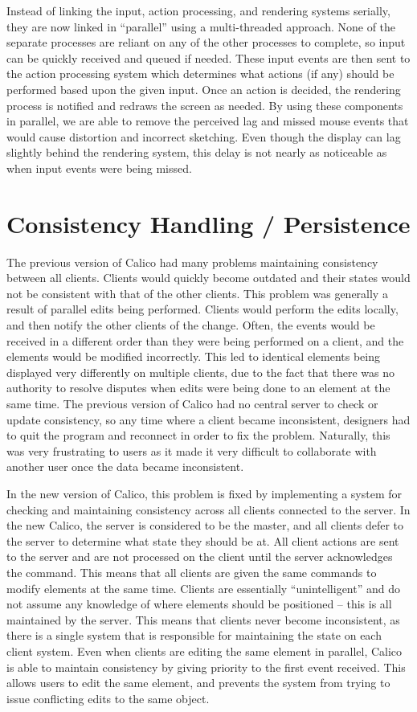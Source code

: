 Instead of linking the input, action processing, and rendering systems serially, they are now linked in ``parallel'' using a multi-threaded approach. None of the separate processes are reliant on any of the other processes to complete, so input can be quickly received and queued if needed. These input events are then sent to the action processing system which determines what actions (if any) should be performed based upon the given input. Once an action is decided, the rendering process is notified and redraws the screen as needed. By using these components in parallel, we are able to remove the perceived lag and missed mouse events that would cause distortion and incorrect sketching. Even though the display can lag slightly behind the rendering system, this delay is not nearly as noticeable as when input events were being missed. 


\section{Consistency Handling / Persistence}
The previous version of Calico had many problems maintaining consistency between all clients. Clients would quickly become outdated and their states would not be consistent with that of the other clients. 
This problem was generally a result of parallel edits being performed. Clients would perform the edits locally, and then notify the other clients of the change. Often, the events would be received in a different order than they were being performed on a client, and the elements would be modified incorrectly. This led to identical elements being displayed very differently on multiple clients, due to the fact that there was no authority to resolve disputes when edits were being done to an element at the same time.
The previous version of Calico had no central server to check or update consistency, so any time where a client became inconsistent, designers had to quit the program and reconnect in order to fix the problem.
Naturally, this was very frustrating to users as it made it very difficult to collaborate with another user once the data became inconsistent. 

In the new version of Calico, this problem is fixed by implementing a system for checking and maintaining consistency across all clients connected to the server. In the new Calico, the server is considered to be the master, and all clients defer to the server to determine what state they should be at. All client actions are sent to the server and are not processed on the client until the server acknowledges the command. This means that all clients are given the same commands to modify elements at the same time. Clients are essentially ``unintelligent'' and do not assume any knowledge of where elements should be positioned -- this is all maintained by the server. This means that clients never become inconsistent, as there is a single system that is responsible for maintaining the state on each client system. 
Even when clients are editing the same element in parallel, Calico is able to maintain consistency by giving priority to the first event received. This allows users to edit the same element, and prevents the system from trying to issue conflicting edits to the same object.

